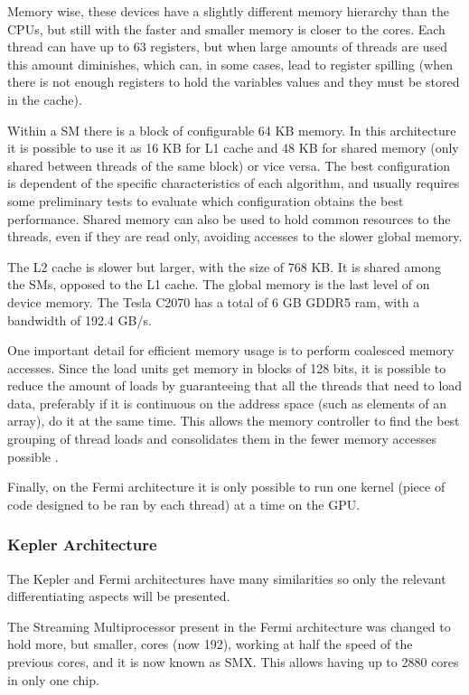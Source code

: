 Memory wise, these devices have a slightly different memory hierarchy than the CPUs, but still with the faster and smaller memory is closer to the \cuda cores. Each \cuda thread can have up to 63 registers, but when large amounts of threads are used this amount diminishes, which can, in some cases, lead to register spilling (when there is not enough registers to hold the variables values and they must be stored in the cache).

Within a SM there is a block of configurable 64 KB memory. In this architecture it is possible to use it as 16 KB for L1 cache and 48 KB for shared memory (only shared between threads of the same block) or vice versa. The best configuration is dependent of the specific characteristics of each algorithm, and usually requires some preliminary tests to evaluate which configuration obtains the best performance. Shared memory can also be used to hold common resources to the threads, even if they are read only, avoiding accesses to the slower global memory.

The L2 cache is slower but larger, with the size of 768 KB. It is shared among the SMs, opposed to the L1 cache. The global memory is the last level of on device memory. The Tesla C2070 has a total of 6 GB GDDR5 ram, with a bandwidth of 192.4 GB/s.

One important detail for efficient memory usage is to perform coalesced memory accesses. Since the load units get memory in blocks of 128 bits, it is possible to reduce the amount of loads by guaranteeing that all the threads that need to load data, preferably if it is continuous on the address space (such as elements of an array), do it at the same time. This allows the memory controller to find the best grouping of thread loads and consolidates them in the fewer memory accesses possible \cite{NVIDIA:Fermi}.

Finally, on the Fermi architecture it is only possible to run one kernel (piece of \cuda code designed to be ran by each \cuda thread) at a time on the GPU.

\subsubsection{\nvidia Kepler Architecture}

The Kepler and Fermi architectures have many similarities so only the relevant differentiating aspects will be presented.

The Streaming Multiprocessor present in the Fermi architecture was changed to hold more, but smaller, \cuda cores (now 192), working at half the speed of the previous \cuda cores, and it is now known as SMX. This allows having up to 2880 \cuda cores in only one chip.

